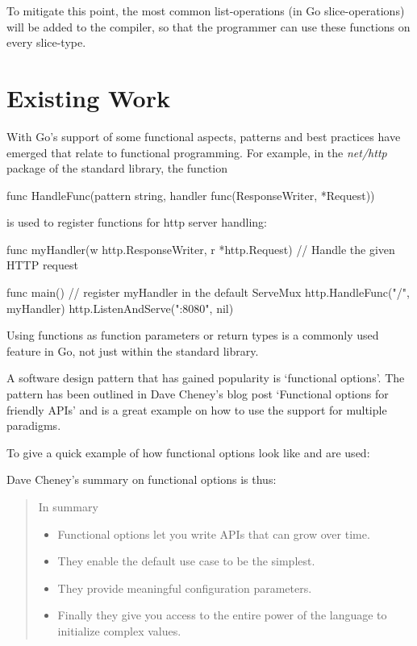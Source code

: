 To mitigate this point, the most common list-operations (in Go slice-operations) will be added to
the compiler, so that the programmer can use these functions on every slice-type.

\section{Existing Work}

With Go's support of some functional aspects, patterns and best practices have emerged that relate
to functional programming.
For example, in the \textit{net/http} package of the standard library, the function
\begin{gocode}
func HandleFunc(pattern string, handler func(ResponseWriter, *Request))
\end{gocode}
is used to register functions for http server handling:

\begin{gocode}
func myHandler(w http.ResponseWriter, r *http.Request) {
    // Handle the given HTTP request
}

func main() {
    // register myHandler in the default ServeMux
    http.HandleFunc("/", myHandler)
    http.ListenAndServe(":8080", nil)
}
\end{gocode}
\autocite{go-http-doc}

Using functions as function parameters or return types is a commonly used feature in Go, not just
within the standard library.

A software design pattern that has gained popularity is `functional options'. The pattern has been
outlined in Dave Cheney's blog post `Functional options for friendly APIs'
and is a great example on how to use the support for multiple paradigms.

To give a quick example of how functional options look like and are used:


Dave Cheney's summary on functional options is thus:
\begin{quote}
    In summary
    \begin{itemize}
        \item Functional options let you write APIs that can grow over time.
        \item They enable the default use case to be the simplest.
        \item They provide meaningful configuration parameters.
        \item Finally they give you access to the entire power of the language to initialize complex values.
    \end{itemize}\autocite{functional-options}
\end{quote}

